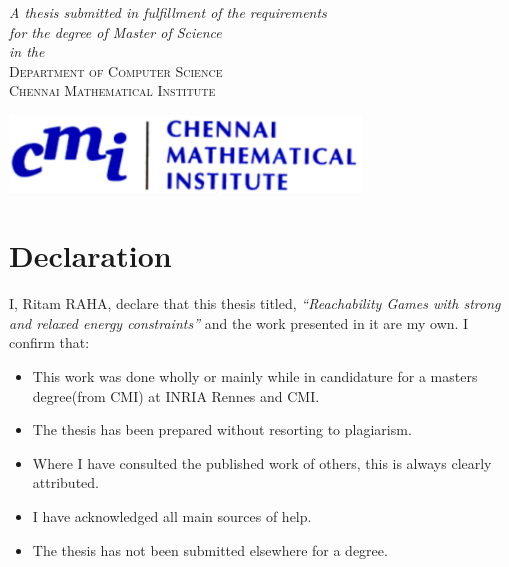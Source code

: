 \documentclass[a4paper,12pt, twoside]{book}
\theoremstyle{definition}
\begin{document}
\begin{titlepage}
	\textit{A thesis submitted in fulfillment of the requirements\\ for the degree of Master of Science}\\
	\vspace{1\baselineskip}
	\textit{in the}\\
	\vspace{1\baselineskip}
	{\scshape Department of Computer Science\\ Chennai Mathematical Institute}

	\vspace{4\baselineskip}
	
	\includegraphics[width=0.7\textwidth]{cmi.png}

	\vfill %
	
\end{titlepage}

\chapter*{Declaration}
I, Ritam RAHA, declare that this thesis titled, \textit{“Reachability Games with strong and relaxed energy constraints”} and the work presented in it are my own. I confirm that:
\vskip 1cm
\begin{itemize}
    \item This work was done wholly or mainly while in candidature for a masters degree(from CMI) at INRIA Rennes and CMI.
    \item The thesis has been prepared without resorting to plagiarism.
    \item Where I have consulted the published work of others, this is always clearly attributed.
    \item I have acknowledged all main sources of help.
    \item The thesis has not been submitted elsewhere for a degree.
\end{itemize}
\vskip 2cm

\chapter*{
}

\thispagestyle{empty}
\null\vfill
\end{document}
